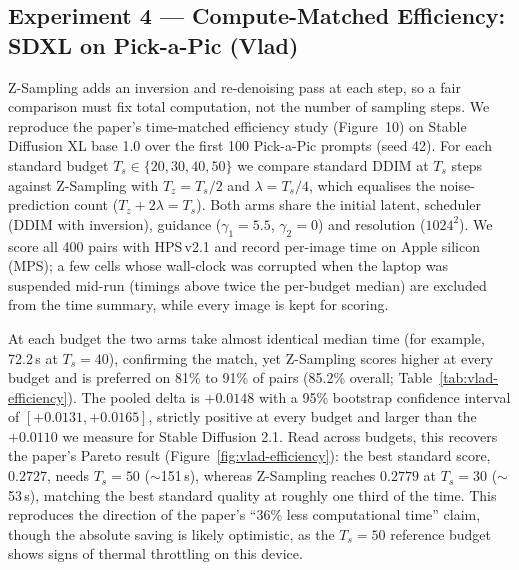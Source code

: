 
\subsection*{Experiment 4 --- Compute-Matched Efficiency: SDXL on Pick-a-Pic (Vlad)}

Z-Sampling adds an inversion and re-denoising pass at each step, so a fair comparison must
fix total computation, not the number of sampling steps. We reproduce the paper's
time-matched efficiency study (Figure~10) on Stable Diffusion XL base 1.0 over the first 100
Pick-a-Pic prompts (seed 42). For each standard budget $T_s \in \{20, 30, 40, 50\}$ we
compare standard DDIM at $T_s$ steps against Z-Sampling with $T_z = T_s/2$ and
$\lambda = T_s/4$, which equalises the noise-prediction count ($T_z + 2\lambda = T_s$). Both
arms share the initial latent, scheduler (DDIM with inversion), guidance ($\gamma_1 = 5.5$,
$\gamma_2 = 0$) and resolution ($1024^2$). We score all 400 pairs with HPS\,v2.1 and record
per-image time on Apple silicon (MPS); a few cells whose wall-clock was corrupted when the
laptop was suspended mid-run (timings above twice the per-budget median) are excluded from
the time summary, while every image is kept for scoring.

At each budget the two arms take almost identical median time (for example, 72.2\,s at
$T_s = 40$), confirming the match, yet Z-Sampling scores higher at every budget and is
preferred on 81\% to 91\% of pairs (85.2\% overall; Table~\ref{tab:vlad-efficiency}). The
pooled delta is $+0.0148$ with a 95\% bootstrap confidence interval of $[+0.0131, +0.0165]$,
strictly positive at every budget and larger than the $+0.0110$ we measure for Stable
Diffusion 2.1. Read across budgets, this recovers the paper's Pareto result
(Figure~\ref{fig:vlad-efficiency}): the best standard score, $0.2727$, needs $T_s = 50$
($\sim$151\,s), whereas Z-Sampling reaches $0.2779$ at $T_s = 30$ ($\sim$53\,s), matching the
best standard quality at roughly one third of the time. This reproduces the direction of the
paper's ``36\% less computational time'' claim, though the absolute saving is likely
optimistic, as the $T_s = 50$ reference budget shows signs of thermal throttling on this
device.

